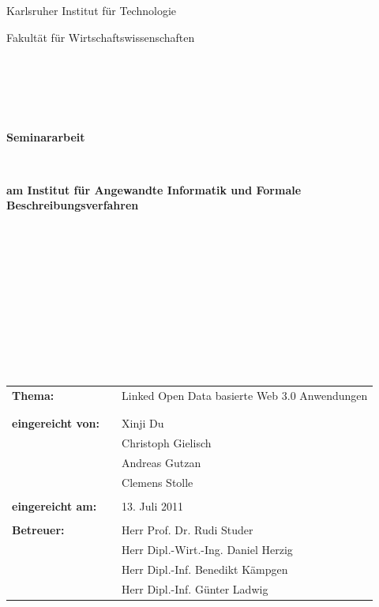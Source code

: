 \documentclass[a4paper, 11pt]{article}
\begin{document}
\thispagestyle{empty}
\begin{center}
\Large{Karlsruher Institut für Technologie}\\
\end{center}

\begin{center}
\Large{Fakultät für Wirtschaftswissenschaften}
\end{center}
\begin{verbatim}





\end{verbatim}
\begin{center}
\textbf{\LARGE{Seminararbeit}}
\end{center}
\begin{verbatim}


\end{verbatim}
\begin{center}
\textbf{am Institut für Angewandte Informatik und Formale Beschreibungsverfahren}
\end{center}
\begin{verbatim}


\end{verbatim}

\begin{verbatim}









\end{verbatim}
\begin{flushleft}
\begin{tabular}{lll}
\textbf{Thema:} & & Linked Open Data basierte Web 3.0 Anwendungen \\
& & \\
& & \\
\textbf{eingereicht von:} & & Xinji Du\\
& & Christoph Gielisch \\
& & Andreas Gutzan \\
& & Clemens Stolle \\
& & \\
\textbf{eingereicht am:} & & 13. Juli 2011\\
& & \\
\textbf{Betreuer:} & & Herr Prof. Dr. Rudi Studer \\
& & Herr Dipl.-Wirt.-Ing. Daniel Herzig \\
& & Herr Dipl.-Inf. Benedikt Kämpgen \\
& & Herr Dipl.-Inf. Günter Ladwig
\end{tabular}
\end{flushleft}
\end{document}
